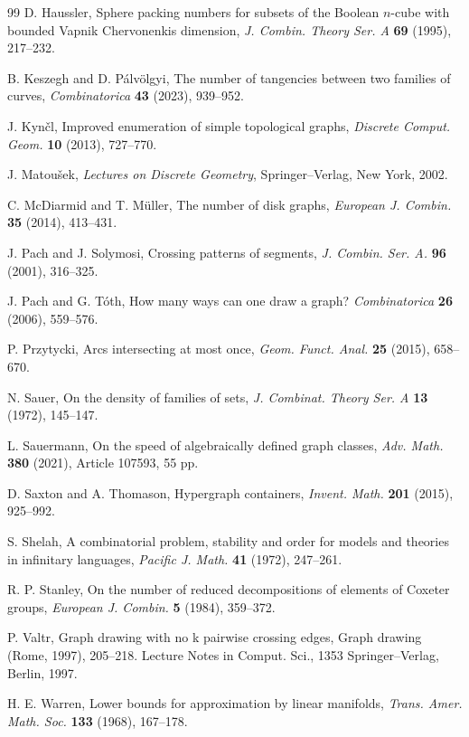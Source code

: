 \documentclass[11pt]{article}
\theoremstyle{plain}
\theoremstyle{definition}
\theoremstyle{remark}
\begin{document}
\begin{thebibliography}{99}
 D. Haussler, Sphere packing numbers for subsets of the Boolean $n$-cube with bounded Vapnik Chervonenkis dimension, \emph{J. Combin. Theory Ser. A} \textbf{69} (1995), 217--232.

 B. Keszegh and D. P\'alv\"olgyi, The number of tangencies between two families of curves, \emph{Combinatorica} \textbf{43} (2023), 939--952.

 J. Kyn\v{c}l, Improved enumeration of simple topological graphs, \emph{Discrete Comput. Geom.} \textbf{10} (2013), 727--770.

 J. Matou\v{s}ek, \emph{Lectures on Discrete Geometry}, Springer--Verlag, New York, 2002.

 C. McDiarmid and T. M\"uller, The number of disk graphs, \emph{European J. Combin.} \textbf{35} (2014), 413--431.

 J. Pach and J. Solymosi, Crossing patterns of segments, \emph{J. Combin. Ser. A.} \textbf{96} (2001), 316--325.


 J. Pach and G. T\'oth, How many ways can one draw a graph? \emph{Combinatorica} \textbf{26} (2006), 559--576.

 P. Przytycki, Arcs intersecting at most once, \emph{Geom. Funct. Anal.} \textbf{25} (2015), 658--670.

 N. Sauer, On the density of families of sets, {\em J. Combinat. Theory Ser. A} \textbf{13} (1972), 145--147.



 L. Sauermann, On the speed of algebraically defined graph classes, \emph{Adv. Math.} \textbf{380} (2021), Article 107593, 55 pp.

 D. Saxton and A. Thomason, Hypergraph containers,
\emph{Invent. Math.} \textbf{201} (2015), 925--992.


 S. Shelah, A combinatorial problem, stability and order for models and theories in infinitary languages, {\em Pacific J.  Math.} \textbf{41} (1972), 247--261.



 R. P. Stanley, On the number of reduced decompositions of elements of Coxeter groups,
\emph{European J. Combin.} \textbf{5} (1984), 359--372.

 P. Valtr,  Graph drawing with no k pairwise crossing edges, Graph drawing (Rome, 1997), 205--218. Lecture Notes in Comput. Sci., 1353
Springer--Verlag, Berlin, 1997.

  H. E. Warren, Lower bounds for approximation by linear manifolds, \emph{Trans.
Amer. Math. Soc.} \textbf{133} (1968), 167--178.

\end{thebibliography}
\end{document}
